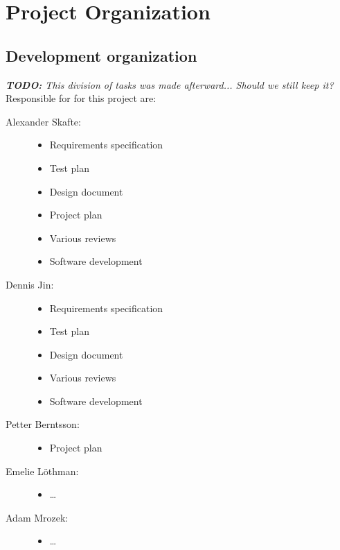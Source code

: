 \documentclass[12pt,titlepage]{article}
\begin{document}

\section{Project Organization}

\subsection{Development organization}

\textit{\textbf{TODO:} This division of tasks was made afterward... Should we
still keep it?} \\

Responsible for for this project are:

\begin{description}
	\item[Alexander Skafte:] \hfill
		\begin{itemize}
			\item Requirements specification
			\item Test plan
			\item Design document
			\item Project plan
			\item Various reviews
			\item Software development
		\end{itemize}
	\item[Dennis Jin:] \hfill
		\begin{itemize}
			\item Requirements specification
			\item Test plan
			\item Design document
			\item Various reviews
			\item Software development
		\end{itemize}
	\item[Petter Berntsson:] \hfill
		\begin{itemize}
			\item Project plan
		\end{itemize}
	\item[Emelie Löthman:] \hfill
		\begin{itemize}
			\item \ldots
		\end{itemize}
	\item[Adam Mrozek:] \hfill
		\begin{itemize}
			\item \ldots
		\end{itemize}
\end{description}
\end{document}
